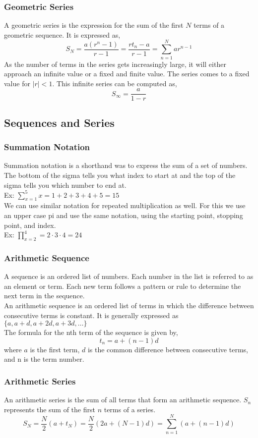 \subsubsection{Geometric Series}
A geometric series is the expression for the sum of the first $N$ terms of a geometric sequence. It is expressed as,
$$S_N=\frac{a(r^n-1)}{r-1}=\frac{rt_n-a}{r-1}=\sum \limits_{n=1}^N ar^{n-1}$$
As the number of terms in the series gets increasingly large, it will either approach an infinite value or a fixed and finite value. The series comes to a fixed value for $|r|<1$. This infinite series can be computed as,
$$S_\infty=\frac{a}{1-r}$$\subsection{Sequences and Series}

\subsubsection{Summation Notation}
Summation notation is a shorthand was to express the sum of a set of numbers. The bottom of the sigma tells you what index to start at and the top of the sigma tells you which number to end at.\\
Ex: $\sum \limits_{x=1}^5 x=1+2+3+4+5=15$\\
We can use similar notation for repeated multiplication as well. For this we use an upper case pi and use the same notation, using the starting point, stopping point, and index.\\
Ex: $\prod \limits_{x=2}^4=2\cdot 3\cdot 4=24$

\subsubsection{Arithmetic Sequence}
A sequence is an ordered list of numbers. Each number in the list is referred to as an element or term. Each new term follows a pattern or rule to determine the next term in the sequence.\\
An arithmetic sequence is an ordered list of terms in which the difference between consecutive terms is constant. It is generally expressed as $\{a,a+d,a+2d,a+3d,\ldots\}$\\ The formula for the nth term of the sequence is given by,
$$t_n=a+(n-1)d$$
where $a$ is the first term, $d$ is the common difference between consecutive terms, and n is the term number.

\subsubsection{Arithmetic Series}
An arithmetic series is the sum of all terms that form an arithmetic sequence. $S_n$ represents the sum of the first $n$ terms of a series.
$$S_N=\frac{N}{2}(a+t_N)=\frac{N}{2}(2a+(N-1)d)=\sum \limits_{n=1}^N (a+(n-1)d)$$

